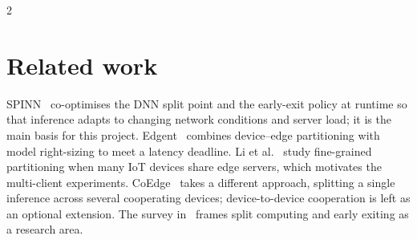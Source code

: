 \documentclass[10pt,a4paper]{article}
\begin{document}
\begin{multicols}{2}
\section{Related work}
SPINN~\cite{spinn} co-optimises the DNN split point and the early-exit policy at runtime so that inference adapts to changing network conditions and server load; it is the main basis for this project. Edgent~\cite{edgent} combines device--edge partitioning with model right-sizing to meet a latency deadline. Li et al.~\cite{li2024} study fine-grained partitioning when many IoT devices share edge servers, which motivates the multi-client experiments. CoEdge~\cite{coedge} takes a different approach, splitting a single inference across several cooperating devices; device-to-device cooperation is left as an optional extension. The survey in~\cite{survey} frames split computing and early exiting as a research area.


\end{multicols}
\end{document}
